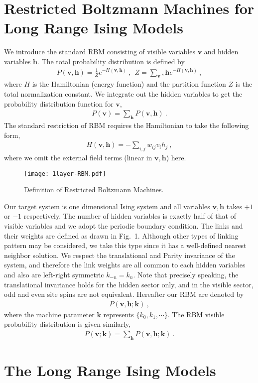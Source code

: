 \documentclass[a4paper,preprint,superscriptaddress,preprintnumbers,nofootinbib]{revtex4}
\newcommand{\Be}{\begin{eqnarray}}
\newcommand{\Ee}{\end{eqnarray}}
\begin{document}
\section{Restricted Boltzmann Machines for Long Range Ising Models}

We introduce the standard RBM consisting of 
visible variables $\bm{v}$ and hidden variables $\bm{h}$.
The total probability distribution is defined by 
\Be
P(\bm{v},\bm{h})=\frac{1}{Z} e^{-H(\bm{v},\bm{h})}\ ,\ \ 
Z=\sum_{\bm v},\bm{h}  e^{-H(\bm{v}, \bm{h})}\ ,
\Ee
where $H$ is the Hamiltonian (energy function)
 and the partition function $Z$ is the total 
normalization constant.
We integrate out the hidden variables to get the probability 
distribution function for $\bm{v}$,
\Be
P(\bm{v})=\sum_{\bm{h}} P(\bm{v},\bm{h})\ .
\Ee
The standard restriction of RBM requires the Hamiltonian to take the
following form,
\Be
H(\bm{v},\bm{h})=-\sum_{i, j} w_{i j} v_i h_j\ ,
\Ee
where we omit the external field terms (linear in $\bm{v},\bm{h}$) here.

\begin{figure}[htbp]
    \centering
    \texttt{[image: 1layer-RBM.pdf]}
    \caption{Definition of Restricted Boltzmann Machines.}       
    \label{fig:1layer-RBM}
\end{figure}

Our target system is one dimensional Ising system and
all variables $\bm{v},\bm{h}$ takes $+1$ or $-1$ respectively.
The number of hidden variables is exactly half of that of visible
variables and we adopt the periodic boundary condition.
The links and their weights are defined as drawn in Fig.~1.
Although other types of linking pattern may be considered,
we take this type since it has a well-defined nearest neighbor
solution. 
We respect the translational and Parity invariance of the system, 
and therefore the link weights are all common to each hidden variables
and also are left-right symmetric $k_{-n}=k_n$.
Note that precisely speaking, the translational invariance holds for the
hidden sector only, and in the visible sector, odd and even site spins
are not equivalent.
Hereafter our RBM  are denoted by
\Be
P(\bm{v},\bm{h};\bm{k})\ ,
\Ee
where the machine parameter $\bm{k}$ represents $\{k_0, k_1, \cdots\}$.
The RBM visible probability distribution is given similarly,
\Be
P(\bm{v};\bm{k})=\sum_{\bm{h}} P(\bm{v},\bm{h};\bm{k})\ .
\Ee


\section{The Long Range Ising Models}
\end{document}
